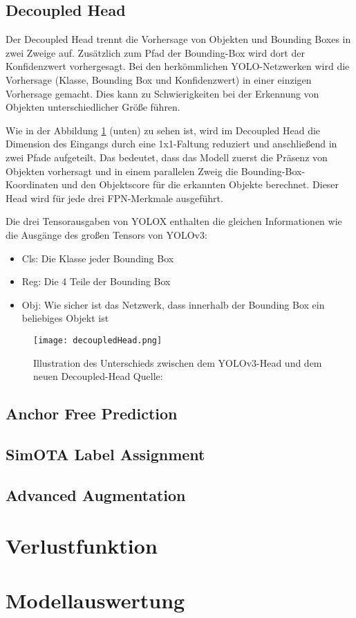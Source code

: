 \subsection{Decoupled Head}\label{decoupledHead}
Der Decoupled Head trennt die Vorhersage von Objekten und Bounding Boxes in zwei Zweige auf. Zusätzlich zum Pfad der Bounding-Box wird dort der Konfidenzwert vorhergesagt. Bei den herkömmlichen YOLO-Netzwerken wird die Vorhersage (Klasse, Bounding Box und Konfidenzwert) in einer einzigen Vorhersage gemacht. Dies kann zu Schwierigkeiten bei der Erkennung von Objekten unterschiedlicher Größe führen. 

Wie in der Abbildung \ref{fig:decoupledHead} (unten) zu sehen ist, wird im Decoupled Head die Dimension des Eingangs durch eine 1x1-Faltung reduziert und anschließend in zwei Pfade aufgeteilt. Das bedeutet, dass das Modell zuerst die Präsenz von Objekten vorhersagt und in einem parallelen Zweig die Bounding-Box-Koordinaten und den Objektscore für die erkannten Objekte berechnet. Dieser Head wird für jede drei FPN-Merkmale ausgeführt. \cite{yoloxExplanationHowWorks}

Die drei Tensorausgaben von YOLOX enthalten die gleichen Informationen wie die Ausgänge des großen Tensors von YOLOv3:
\begin{itemize}
\item Cls: Die Klasse jeder Bounding Box
\item Reg: Die 4 Teile der Bounding Box
\item Obj: Wie sicher ist das Netzwerk, dass innerhalb der Bounding Box ein beliebiges Objekt ist
\end{itemize}


\begin{figure}[h]
	\centering
	\texttt{[image: decoupledHead.png]}
	\caption[Illustration des Unterschieds zwischen dem Yolov3-Head und dem neuen Decoupled-Head ]{Illustration des Unterschieds zwischen dem YOLOv3-Head und dem neuen Decoupled-Head Quelle: \cite{yoloxPaper}}
	\label{fig:decoupledHead}
\end{figure}




\subsection{Anchor Free Prediction}



\subsection{SimOTA Label Assignment}


\subsection{Advanced Augmentation}


\section{Verlustfunktion}



\section{Modellauswertung}